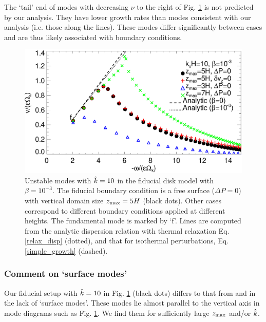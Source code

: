 The `tail' end of modes with decreasing $\nu$ to the right of
Fig. \ref{compare_modes_iso_kx10} is not predicted by our 
analysis. They have lower growth rates than modes consistent with our
analysis (i.e. those along the lines). These modes differ significantly between
cases and are thus likely associated with boundary conditions. %

\begin{figure}
  \includegraphics[width=\linewidth]{figures/compare_modes_iso_kx10_analytic.ps}
  \caption{Unstable modes with $\hat{k}=10$ in the fiducial disk model
    with $\beta=10^{-3}$. %
    The fiducial boundary condition is a free surface ($\Delta P=0$)
    with vertical domain size $z_\mathrm{max}=5H$  (black dots).  Other
    cases correspond to different boundary conditions applied at
    different heights. The fundamental mode is marked by `f'. Lines
    are computed from the analytic dispersion relation 
    with thermal relaxation Eq. \ref{relax_disp} (dotted), and that for
    isothermal perturbations, Eq. \ref{simple_growth} (dashed). 
    \label{compare_modes_iso_kx10} 
  }
\end{figure}

\subsubsection{Comment on `surface modes'}\label{surf_comment}
Our fiducial setup with $\hat{k}=10$ in 
Fig. \ref{compare_modes_iso_kx10} (black dots) differs to that from
\cite{nelson13} and \cite{mcnally14} in the lack of `surface modes'. 
These modes lie almost parallel to the vertical axis in mode 
diagrams such as Fig. \ref{compare_modes_iso_kx10}. We find them for 
sufficiently large $z_\mathrm{max}$ and/or $\hat{k}$. 

